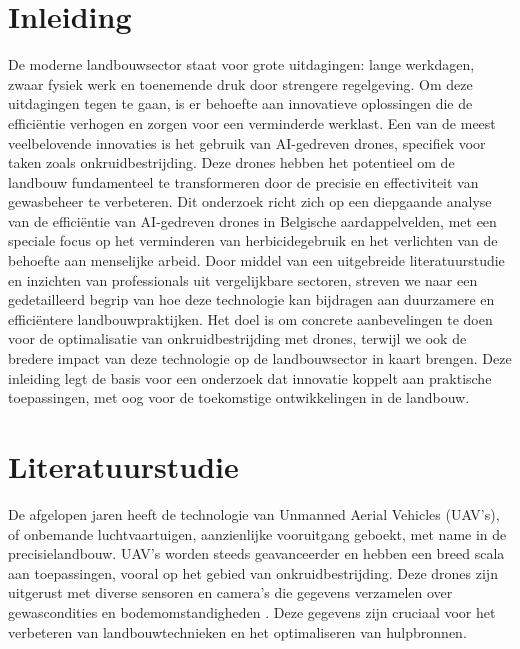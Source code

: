 \documentclass{hogent-article}
\begin{document}
\section{Inleiding}%
\label{sec:inleiding}

De moderne landbouwsector staat voor grote uitdagingen: lange werkdagen, zwaar fysiek werk en toenemende druk door strengere regelgeving. Om deze uitdagingen tegen te gaan, is er behoefte aan innovatieve oplossingen die de efficiëntie verhogen en zorgen voor een verminderde werklast. Een van de meest veelbelovende innovaties is het gebruik van AI-gedreven drones, specifiek voor taken zoals onkruidbestrijding. Deze drones hebben het potentieel om de landbouw fundamenteel te transformeren door de precisie en effectiviteit van gewasbeheer te verbeteren. Dit onderzoek richt zich op een diepgaande analyse van de efficiëntie van AI-gedreven drones in Belgische aardappelvelden, met een speciale focus op het verminderen van herbicidegebruik en het verlichten van de behoefte aan menselijke arbeid. Door middel van een uitgebreide literatuurstudie en inzichten van professionals uit vergelijkbare sectoren, streven we naar een gedetailleerd begrip van hoe deze technologie kan bijdragen aan duurzamere en efficiëntere landbouwpraktijken. Het doel is om concrete aanbevelingen te doen voor de optimalisatie van onkruidbestrijding met drones, terwijl we ook de bredere impact van deze technologie op de landbouwsector in kaart brengen. Deze inleiding legt de basis voor een onderzoek dat innovatie koppelt aan praktische toepassingen, met oog voor de toekomstige ontwikkelingen in de landbouw.


\section{Literatuurstudie}%
\label{sec:literatuurstudie}

De afgelopen jaren heeft de technologie van Unmanned Aerial Vehicles (UAV's), of onbemande luchtvaartuigen, aanzienlijke vooruitgang geboekt, met name in de precisielandbouw. UAV's worden steeds geavanceerder en hebben een breed scala aan toepassingen, vooral op het gebied van onkruidbestrijding. Deze drones zijn uitgerust met diverse sensoren en camera’s die gegevens verzamelen over gewascondities en bodemomstandigheden \autocite{istiak2023adoption,hunt2018good}. Deze gegevens zijn cruciaal voor het verbeteren van landbouwtechnieken en het optimaliseren van hulpbronnen.
\end{document}
